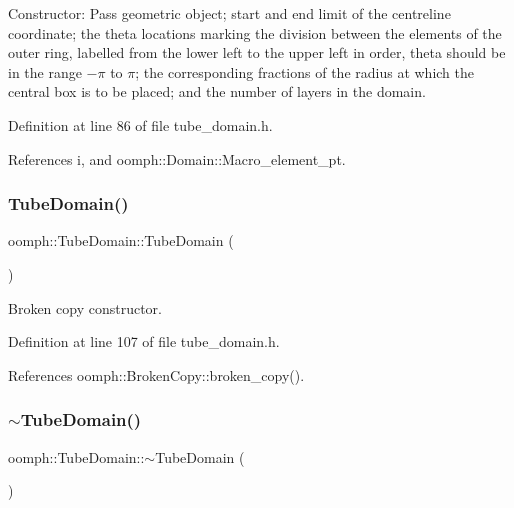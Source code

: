 Constructor\+: Pass geometric object; start and end limit of the centreline coordinate; the theta locations marking the division between the elements of the outer ring, labelled from the lower left to the upper left in order, theta should be in the range $-\pi$ to $\pi$; the corresponding fractions of the radius at which the central box is to be placed; and the number of layers in the domain. 



Definition at line 86 of file tube\+\_\+domain.\+h.



References i, and oomph\+::\+Domain\+::\+Macro\+\_\+element\+\_\+pt.

\mbox{\label{classoomph_1_1TubeDomain_a39d38474ae91e479d615e315445b22c5}} 
\subsubsection{\texorpdfstring{Tube\+Domain()}{TubeDomain()}\hspace{0.1cm}{\footnotesize\ttfamily [2/2]}}
{\footnotesize\ttfamily oomph\+::\+Tube\+Domain\+::\+Tube\+Domain (\begin{DoxyParamCaption}\item[{const \hyperlink{classoomph_1_1TubeDomain}{Tube\+Domain} \&}]{ }\end{DoxyParamCaption})\hspace{0.3cm}{\ttfamily [inline]}}



Broken copy constructor. 



Definition at line 107 of file tube\+\_\+domain.\+h.



References oomph\+::\+Broken\+Copy\+::broken\+\_\+copy().

\mbox{\label{classoomph_1_1TubeDomain_ad836e9ab146d2317ed55ee199d54b3e4}} 
\subsubsection{\texorpdfstring{$\sim$\+Tube\+Domain()}{~TubeDomain()}}
{\footnotesize\ttfamily oomph\+::\+Tube\+Domain\+::$\sim$\+Tube\+Domain (\begin{DoxyParamCaption}{ }\end{DoxyParamCaption})\hspace{0.3cm}{\ttfamily [inline]}}



